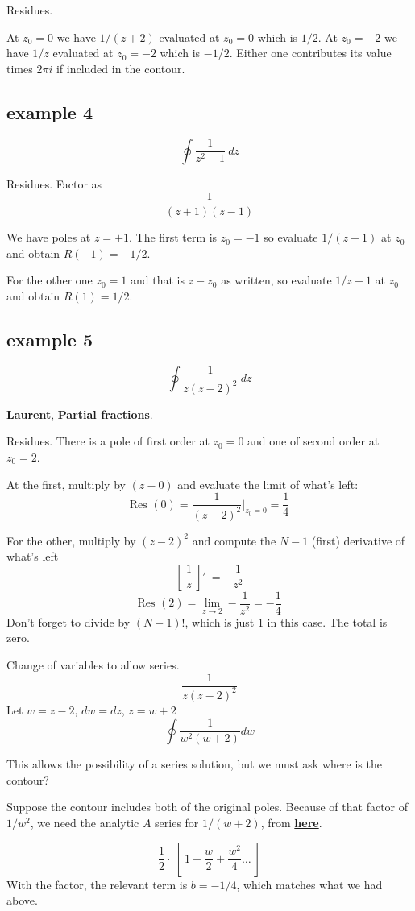 \documentclass[11pt, oneside]{article}
\begin{document}
Residues.

At $z_0 = 0$ we have $1/(z+2)$ evaluated at $z_0 = 0$ which is $1/2$.  At $z_0 = -2$ we have $1/z$ evaluated at $z_0 = -2$ which is $-1/2$.  Either one contributes its value times $2 \pi i$ if included in the contour.

\subsection*{example 4}
\[ \oint \frac{1}{z^2 - 1} \ dz \]

Residues.  Factor as
\[ \frac{1}{(z + 1)(z - 1)} \]

We have poles at $z = \pm 1$.  The first term is $z_0 = -1$ so evaluate $1/(z - 1)$ at $z_0$ and obtain $R(-1) = -1/2$.

For the other one $z_0 = 1$ and that is $z - z_0$ as written, so evaluate $1/z+1$ at $z_0$ and obtain $R(1) = 1/2$.

\subsection*{example 5}
\[ \oint \frac{1}{z(z - 2)^2} \ dz \]

\hyperref[sec:ex5L]{\textbf{Laurent}}, \hyperref[sec:ex5PF]{\textbf{Partial fractions}}.

Residues.  There is a pole of first order at $z_0=0$ and one of second order at $z_0=2$.  

At the first, multiply by $(z - 0)$ and evaluate the limit of what's left:
\[ \text{Res }(0) = \frac{1}{(z-2)^2} \bigg |_{z_0 = 0} = \frac{1}{4} \]

For the other, multiply by $(z-2)^2$ and compute the $N-1$ (first) derivative of what's left
\[ [ \ \frac{1}{z} \ ]' \ =  - \frac{1}{z^2} \]
\[ \text{Res } (2) = \lim_{z \rightarrow 2} -\frac{1}{z^2} = -\frac{1}{4} \]
Don't forget to divide by $(N-1)!$, which is just $1$ in this case.  The total is zero.

Change of variables to allow series.
\[ \frac{1}{z(z-2)^2} \]
Let $w = z - 2$, $dw = dz$, $z = w + 2$
\[ \oint \frac{1}{w^2(w+2)} dw \]

This allows the possibility of a series solution, but we must ask where is the contour?

Suppose the contour includes both of the original poles.  Because of that factor of $1/w^2$, we need the analytic $A$ series for $1/(w+2)$, from \hyperref[sec:a_plus_z]{\textbf{here}}.

\[ \frac{1}{2} \cdot \ [ \ 1 - \frac{w}{2} + \frac{w^2}{4} \dots \ ]    \]
With the factor, the relevant term is $b = -1/4$, which matches what we had above.
\end{document}
